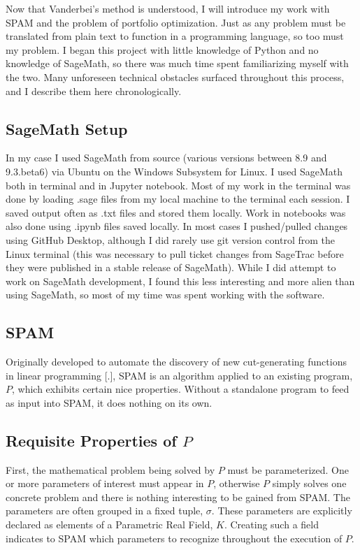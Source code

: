 \documentclass{article}
\begin{document}
Now that Vanderbei's method is understood, I will introduce my work with SPAM and the problem of portfolio optimization. Just as any problem must be translated from plain text to function in a programming language, so too must my problem. I began this project with little knowledge of Python and no knowledge of SageMath, so there was much time spent familiarizing myself with the two. Many unforeseen technical obstacles surfaced throughout this process, and I describe them here chronologically.

\subsection{SageMath Setup}

In my case I used SageMath from source (various versions between 8.9 and 9.3.beta6) via Ubuntu on the Windows Subsystem for Linux. I used SageMath both in terminal and in Jupyter notebook. Most of my work in the terminal was done by loading .sage files from my local machine to the terminal each session. I saved output often as .txt files and stored them locally. Work in notebooks was also done using .ipynb files saved locally. In most cases I pushed/pulled changes using GitHub Desktop, although I did rarely use git version control from the Linux terminal (this was necessary to pull ticket changes from SageTrac before they were published in a stable release of SageMath). While I did attempt to work on SageMath development, I found this less interesting and more alien than using SageMath, so most of my time was spent working with the software. 

\subsection{SPAM}

Originally developed to automate the discovery of new 
cut-generating functions in linear programming [.], 
SPAM is an algorithm applied to an existing program, $P$, which exhibits certain nice properties. Without a standalone program to feed as input into SPAM, it does nothing on its own.

\subsection{Requisite Properties of $P$} 
First, the mathematical problem being solved by $P$ must be parameterized. One or more parameters of interest must appear in $P$, otherwise $P$ simply solves one concrete problem and there is nothing interesting to be gained from SPAM. The parameters are often grouped in a fixed tuple, $\sigma$. These parameters are explicitly declared as elements of a Parametric Real Field, $K$. Creating such a field indicates to SPAM which parameters to recognize throughout the execution of $P$. 
\end{document}
